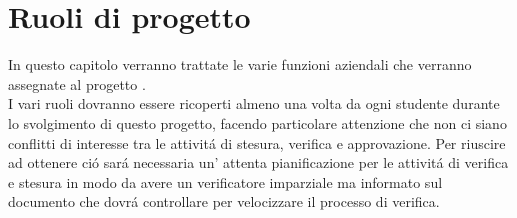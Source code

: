 \section{Ruoli di progetto}
In questo capitolo verranno trattate le varie funzioni aziendali che verranno assegnate al progetto \progetto .\\
I vari ruoli dovranno essere ricoperti almeno una volta da ogni studente durante lo svolgimento di questo progetto, facendo particolare attenzione che non ci siano conflitti di interesse tra le attivit\'a di stesura, verifica e approvazione. Per riuscire ad ottenere ci\'o sar\'a necessaria un' attenta pianificazione per le attivit\'a di verifica e stesura in modo da avere un verificatore imparziale ma informato sul documento che dovr\'a controllare per velocizzare il processo di verifica.